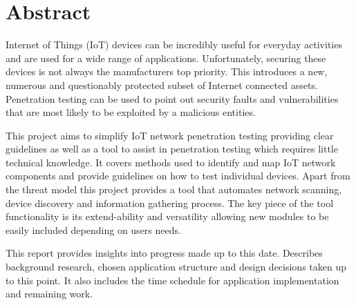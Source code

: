 


\section{Abstract}

Internet of Things (IoT) devices can be incredibly useful for everyday activities and are used for a wide range of applications. Unfortunately, securing these devices is not always the manufacturers top priority. This introduces a new, numerous and questionably protected subset of Internet connected assets. Penetration testing can be used to point out security faults and vulnerabilities that are most likely to be exploited by a malicious entities. 

This project aims to simplify IoT network penetration testing providing clear guidelines as well as a tool to assist in penetration testing which requires little technical knowledge. It covers methods used to identify and map IoT network components and provide guidelines on how to test individual devices. Apart from the threat model this project provides a tool that automates network scanning, device discovery and information gathering process. The key piece of the tool functionality is its extend-ability and versatility allowing new modules to be easily included depending on users needs.

This report provides insights into progress made up to this date. Describes background research, chosen application structure and design decisions taken up to this point. It also includes the time schedule for application implementation and remaining work.